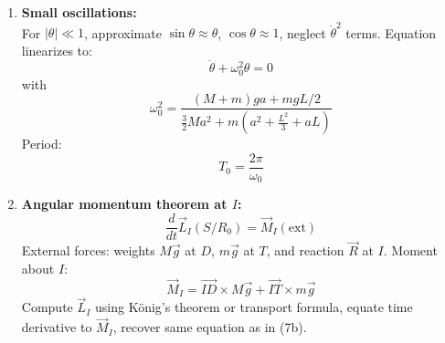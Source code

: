\documentclass[12pt]{article}
\begin{document}
\begin{answerbox}
\begin{enumerate}
\begin{enumerate}
      \end{enumerate}

      \item \textbf{Small oscillations:} \\
      For \(|\theta| \ll 1\), approximate \(\sin\theta \approx \theta\), \(\cos\theta \approx 1\), neglect \(\dot{\theta}^2\) terms. Equation linearizes to:
      \[
      \ddot{\theta} + \omega_0^2 \theta = 0
      \]
      with
      \[
      \omega_0^2 = \frac{(M+m)g a + m g L/2}{\frac{3}{2} M a^2 + m\left(a^2 + \frac{L^2}{3} + a L\right)}
      \]
      Period:
      \[
      T_0 = \frac{2\pi}{\omega_0}
      \]

      \item \textbf{Angular momentum theorem at \(I\):} \\
      \[
      \frac{d}{dt} \vec{L}_I(S/R_0) = \vec{M}_I(\text{ext})
      \]
      External forces: weights \(M\vec{g}\) at \(D\), \(m\vec{g}\) at \(T\), and reaction \(\vec{R}\) at \(I\). Moment about \(I\):
      \[
      \vec{M}_I = \overrightarrow{ID} \times M\vec{g} + \overrightarrow{IT} \times m\vec{g}
      \]
      Compute \(\vec{L}_I\) using König's theorem or transport formula, equate time derivative to \(\vec{M}_I\), recover same equation as in (7b).

  \end{enumerate}
\end{answerbox}

\end{document}
